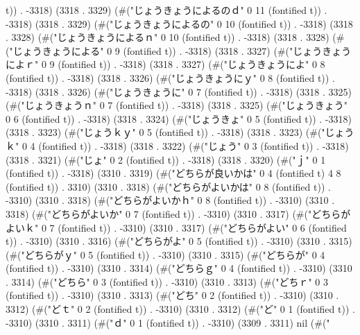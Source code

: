 t)) . -3318) (3318 . 3329) (#("じょうきょうによるのｄ" 0 11 (fontified t)) . -3318) (3318 . 3329) (#("じょうきょうによるの" 0 10 (fontified t)) . -3318) (3318 . 3328) (#("じょうきょうによるｎ" 0 10 (fontified t)) . -3318) (3318 . 3328) (#("じょうきょうによる" 0 9 (fontified t)) . -3318) (3318 . 3327) (#("じょうきょうによｒ" 0 9 (fontified t)) . -3318) (3318 . 3327) (#("じょうきょうによ" 0 8 (fontified t)) . -3318) (3318 . 3326) (#("じょうきょうにｙ" 0 8 (fontified t)) . -3318) (3318 . 3326) (#("じょうきょうに" 0 7 (fontified t)) . -3318) (3318 . 3325) (#("じょうきょうｎ" 0 7 (fontified t)) . -3318) (3318 . 3325) (#("じょうきょう" 0 6 (fontified t)) . -3318) (3318 . 3324) (#("じょうきょ" 0 5 (fontified t)) . -3318) (3318 . 3323) (#("じょうｋｙ" 0 5 (fontified t)) . -3318) (3318 . 3323) (#("じょうｋ" 0 4 (fontified t)) . -3318) (3318 . 3322) (#("じょう" 0 3 (fontified t)) . -3318) (3318 . 3321) (#("じょ" 0 2 (fontified t)) . -3318) (3318 . 3320) (#("ｊ" 0 1 (fontified t)) . -3318) (3310 . 3319) (#("どちらが良いかは" 0 4 (fontified t) 4 8 (fontified t)) . 3310) (3310 . 3318) (#("どちらがよいかは" 0 8 (fontified t)) . -3310) (3310 . 3318) (#("どちらがよいかｈ" 0 8 (fontified t)) . -3310) (3310 . 3318) (#("どちらがよいか" 0 7 (fontified t)) . -3310) (3310 . 3317) (#("どちらがよいｋ" 0 7 (fontified t)) . -3310) (3310 . 3317) (#("どちらがよい" 0 6 (fontified t)) . -3310) (3310 . 3316) (#("どちらがよ" 0 5 (fontified t)) . -3310) (3310 . 3315) (#("どちらがｙ" 0 5 (fontified t)) . -3310) (3310 . 3315) (#("どちらが" 0 4 (fontified t)) . -3310) (3310 . 3314) (#("どちらｇ" 0 4 (fontified t)) . -3310) (3310 . 3314) (#("どちら" 0 3 (fontified t)) . -3310) (3310 . 3313) (#("どちｒ" 0 3 (fontified t)) . -3310) (3310 . 3313) (#("どち" 0 2 (fontified t)) . -3310) (3310 . 3312) (#("どｔ" 0 2 (fontified t)) . -3310) (3310 . 3312) (#("ど" 0 1 (fontified t)) . -3310) (3310 . 3311) (#("ｄ" 0 1 (fontified t)) . -3310) (3309 . 3311) nil (#("
